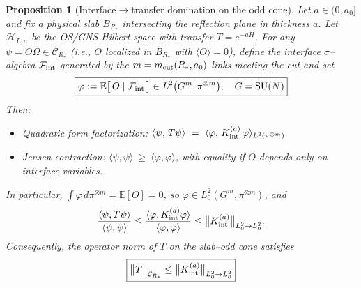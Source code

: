 \documentclass[11pt]{amsart}
\theoremstyle{plain}
\newtheorem{proposition}[theorem]{Proposition}
\theoremstyle{definition}
\theoremstyle{remark}
\begin{document}
\begin{proposition}[Interface$\to$transfer domination on the odd cone]\label{prop:int-to-transfer}
Let $a\in(0,a_0]$ and fix a physical slab $B_{R_*}$ intersecting the reflection plane in thickness $a$. Let $\mathcal H_{L,a}$ be the OS/GNS Hilbert space with transfer $T=e^{-aH}$. For any $\psi=O\Omega\in\mathcal C_{R_*}$ (i.e., $O$ localized in $B_{R_*}$ with $\langle O\rangle=0$), define the interface $\sigma$--algebra $\mathcal F_{\rm int}$ generated by the $m=m_{\rm cut}(R_*,a_0)$ links meeting the cut and set
\begin{equation}
  \boxed{
    \varphi := \mathbb E\big[\,O \mid \mathcal F_{\rm int}\,\big] \in L^2\big(G^m,\pi^{\otimes m}\big), \quad G=\mathrm{SU}(N)
  }
\end{equation}
Then:
\begin{itemize}
  \item[(i)] Quadratic form factorization: \(\langle \psi,\,T\psi\rangle\ =\ \langle \varphi,\,K_{\rm int}^{(a)}\,\varphi\rangle_{L^2(\pi^{\otimes m})}.\)
  \item[(ii)] Jensen contraction: \(\langle \psi,\psi\rangle\ \ge\ \langle \varphi,\varphi\rangle\), with equality if $O$ depends only on interface variables.
\end{itemize}
In particular, $\int \varphi\,d\pi^{\otimes m}=\mathbb E[O]=0$, so $\varphi\in L^2_0(G^m,\pi^{\otimes m})$, and
\begin{equation}
  \frac{\langle \psi, T\psi\rangle}{\langle \psi,\psi\rangle}
  \le \frac{\langle \varphi, K_{\rm int}^{(a)}\varphi\rangle}{\langle \varphi,\varphi\rangle}
  \le \big\|K_{\rm int}^{(a)}\big\|_{L^2_0\to L^2_0}.
\end{equation}
Consequently, the operator norm of $T$ on the slab--odd cone satisfies
\begin{equation}
  \boxed{
    \big\|T\big\|_{\mathcal C_{R_*}} \le \big\|K_{\rm int}^{(a)}\big\|_{L^2_0\to L^2_0}
  }
\end{equation}
\end{proposition}
\end{document}
